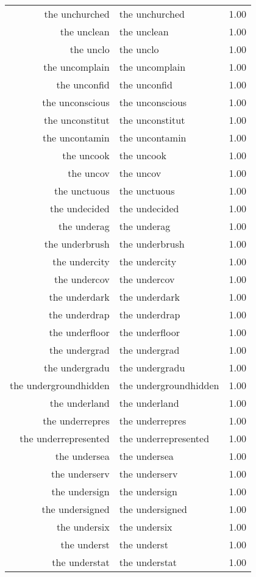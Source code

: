 \begin{table}[ht]
\begin{tabular}{rlr}
  the unchurched & the unchurched & 1.00 \\ 
  the unclean & the unclean & 1.00 \\ 
  the unclo & the unclo & 1.00 \\ 
  the uncomplain & the uncomplain & 1.00 \\ 
  the unconfid & the unconfid & 1.00 \\ 
  the unconscious & the unconscious & 1.00 \\ 
  the unconstitut & the unconstitut & 1.00 \\ 
  the uncontamin & the uncontamin & 1.00 \\ 
  the uncook & the uncook & 1.00 \\ 
  the uncov & the uncov & 1.00 \\ 
  the unctuous & the unctuous & 1.00 \\ 
  the undecided & the undecided & 1.00 \\ 
  the underag & the underag & 1.00 \\ 
  the underbrush & the underbrush & 1.00 \\ 
  the undercity & the undercity & 1.00 \\ 
  the undercov & the undercov & 1.00 \\ 
  the underdark & the underdark & 1.00 \\ 
  the underdrap & the underdrap & 1.00 \\ 
  the underfloor & the underfloor & 1.00 \\ 
  the undergrad & the undergrad & 1.00 \\ 
  the undergradu & the undergradu & 1.00 \\ 
  the undergroundhidden & the undergroundhidden & 1.00 \\ 
  the underland & the underland & 1.00 \\ 
  the underrepres & the underrepres & 1.00 \\ 
  the underrepresented & the underrepresented & 1.00 \\ 
  the undersea & the undersea & 1.00 \\ 
  the underserv & the underserv & 1.00 \\ 
  the undersign & the undersign & 1.00 \\ 
  the undersigned & the undersigned & 1.00 \\ 
  the undersix & the undersix & 1.00 \\ 
  the underst & the underst & 1.00 \\ 
  the understat & the understat & 1.00 \\ 

\end{tabular}
\end{table}
